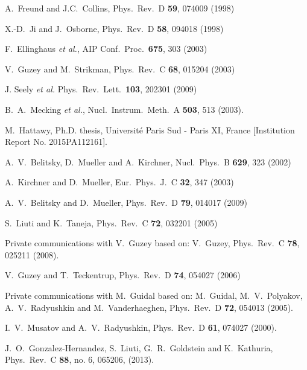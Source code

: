 \documentclass[twocolumn,nofootinbib,showpacs,prl,superscriptaddress,secnumarabic,amssymb,nobibnotes,aps,floatfix]{revtex4}
\begin{document}
\begin{thebibliography}{99}
A.~Freund and J.C.~Collins, 
Phys.\ Rev.\ D {\bf 59}, 074009 (1998)

X.-D.~Ji and J.~Osborne, 
Phys.\ Rev.\ D {\bf 58}, 094018 (1998)

F.~Ellinghaus {\it et al.},
AIP Conf.\ Proc.\  {\bf 675}, 303 (2003)

  V.~Guzey and M.~Strikman,
  Phys.\ Rev.\ C {\bf 68}, 015204 (2003)

J. Seely {\it et al.} 
Phys.\ Rev.\ Lett.\ {\bf 103}, 202301 (2009)

   B.~A.~Mecking {\it et al.},
   Nucl.\ Instrum.\ Meth.\ A {\bf 503}, 513 (2003).

M.~Hattawy, Ph.D. thesis, Universit{\'e} Paris Sud - Paris XI, France 
[Institution Report No. 2015PA112161].

A.~V.~Belitsky, D.~Mueller and A.~Kirchner,
Nucl.\ Phys.\ B {\bf 629}, 323 (2002)

A.~Kirchner and D.~Mueller, 
Eur.\ Phys.\ J.\ C {\bf 32}, 347 (2003)

A.~V.~Belitsky and D.~Mueller,
Phys.\ Rev.\ D {\bf 79}, 014017 (2009)


S.~Liuti and K.~Taneja, 
Phys.\ Rev.\ C {\bf 72}, 032201 (2005)

Private communications with V.~Guzey based on: 
V.~Guzey, Phys.\ Rev.\ C {\bf 78}, 025211 (2008).

V.~Guzey and T.~Teckentrup,
Phys.\ Rev.\ D {\bf 74}, 054027 (2006)

Private communications with M.~Guidal based on: 
M.~Guidal, M.~V.~Polyakov, A.~V.~Radyushkin and M.~Vanderhaeghen, 
Phys.\ Rev.\ D {\bf 72}, 054013 (2005).

I.~V.~Musatov and A.~V.~Radyushkin, 
Phys.\ Rev.\ D {\bf 61}, 074027 (2000).

J.~O.~Gonzalez-Hernandez, S.~Liuti, G.~R.~Goldstein and K.~Kathuria,
Phys.\ Rev.\ C {\bf 88}, no. 6, 065206, (2013).

\end{thebibliography}
\end{document}
